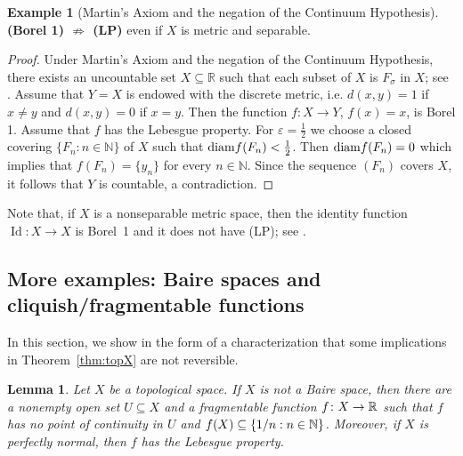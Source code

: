 \documentclass[a4paper]{amsart}
\theoremstyle{plain}
\newtheorem{lemma}[theorem]{Lemma}
\theoremstyle{definition}
\newtheorem{example}[theorem]{Example}
\theoremstyle{remark}
\numberwithin{equation}{section}
\begin{document}
			\begin{example}[Martin's Axiom and the negation of the Continuum Hypothesis]
			{\bf (Borel 1) $\not\Rightarrow$ (LP)} even if $X$ is metric and separable.
		\end{example}
		
		\begin{proof}
			Under Martin's Axiom and the negation of the Continuum Hypothesis, there exists an uncountable  set $X\subseteq\mathbb R$ such that each subset of $X$ is $F_\sigma$ in $X$; see \cite[Theorem 9.6]{Buk}. Assume that $Y=X$ is endowed with the discrete metric, i.e. $d(x,y)=1$ if $x\ne y$ and $d(x,y)=0$ if $x=y$.  Then the function $f\colon X\to Y$, $f(x)=x$, is Borel 1. Assume that $f$ has the Lebesgue property. For $\varepsilon=\tfrac{1}{2}$ we choose a closed covering $\{F_n:n\in\mathbb N\}$ of $X$ such that ${\rm diam}f(F_n)<\tfrac{1}{2}$. Then ${\rm diam} f(F_n)=0$ which implies that $f(F_n)=\{y_n\}$ for every $n\in\mathbb N$. Since the sequence $(F_n)$ covers $X$, it follows that $Y$ is countable, a contradiction.
		\end{proof}

 Note that, if $X$ is a nonseparable metric space, then the identity function $\operatorname{Id}\colon X\to X$ is Borel~1 and it does not have (LP); see \cite[Proposition 2.1]{BHH}.
 
 \subsection{More examples: Baire spaces and cliquish/fragmentable  functions} 
 \label{sec:examples2}

In this section, we show in the form of a characterization that some implications
in Theorem~\ref{thm:topX} are not reversible. 

 \begin{lemma} \label{le:lubica} Let $X$ be a topological space. If $X$ is not a Baire space, then there are a nonempty open set $U \subseteq X$ and a fragmentable function $f\colon X \to \Bbb R$ such that $f$ has no point of continuity in $U$ and $f(X) \subseteq \{1/n: n \in \Bbb N\}$. Moreover, if $X$ is perfectly normal, then $f$ has the Lebesgue property.
 \end{lemma}
 
\end{document}
